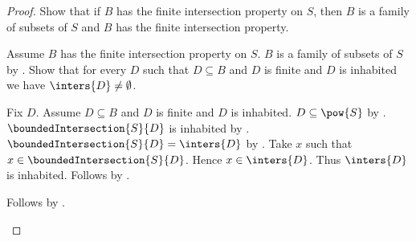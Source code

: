 \begin{proof}
    Show that if $B$ has the finite intersection property on $S$, then
        $B$ is a family of subsets of $S$ and
        $B$ has the finite intersection property.
    \begin{subproof}
        Assume $B$ has the finite intersection property on $S$.
        $B$ is a family of subsets of $S$ by
            .
        Show that for every $D$ such that $D\subseteq B$ and
            $D$ is finite and $D$ is inhabited we have
            $\inters{D}\neq\emptyset$.
        \begin{subproof}
            Fix $D$.
            Assume $D\subseteq B$ and $D$ is finite and $D$ is inhabited.
            $D\subseteq\pow{S}$ by
                .
            $\boundedIntersection{S}{D}$ is inhabited by
                .
            $\boundedIntersection{S}{D}=\inters{D}$ by
                .
            Take $x$ such that $x\in\boundedIntersection{S}{D}$.
            Hence $x\in\inters{D}$.
            Thus $\inters{D}$ is inhabited.
            Follows by .
        \end{subproof}
        Follows by .
    \end{subproof}


\end{proof}
